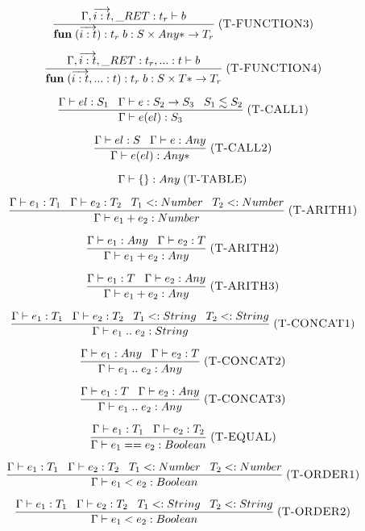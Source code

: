 \documentclass[12pt]{article}
\newcommand{\mylabel}[1]{\; (\textsc{#1})}
\newcommand{\subtype}{<:}
\newcommand{\kw}[1]{\mathbf{#1} \;}
\newcommand{\env}{\Gamma}
\newcommand{\ret}{\string_RET}
\begin{document}
\[
\frac{\env, \overrightarrow{i:t}, \ret:t_{r} \vdash b}
     {\kw{fun} (\overrightarrow{i:t}):t_{r} \; b :
      S \times {Any*} \rightarrow T_{r}}
\mylabel{T-FUNCTION3}
\]

\[
\frac{\env, \overrightarrow{i:t}, \ret:t_{r}, {...}:t \vdash b}
     {\kw{fun} (\overrightarrow{i:t}, {...}:t):t_{r} \; b :
      S \times {T*} \rightarrow T_{r}}
\mylabel{T-FUNCTION4}
\]

\[
\frac{\env \vdash el:S_{1} \;\;\;
      \env \vdash e:S_{2} \rightarrow S_{3} \;\;\;
      S_{1} \lesssim S_{2}}
     {\env \vdash e(el) : S_{3}}
\mylabel{T-CALL1}
\]

\[
\frac{\env \vdash el:S \;\;\;
      \env \vdash e:Any}
     {\env \vdash e(el) : {Any*}}
\mylabel{T-CALL2}
\]

\[
\env \vdash \{\} : Any
\mylabel{T-TABLE}
\]

\[
\frac{\env \vdash e_{1}:T_{1} \;\;\;
      \env \vdash e_{2}:T_{2} \;\;\;
      T_{1} \subtype Number \;\;\;
      T_{2} \subtype Number}
     {\env \vdash e_{1} + e_{2} : Number}
\mylabel{T-ARITH1}
\]

\[
\frac{\env \vdash e_{1}:Any \;\;\;
      \env \vdash e_{2}:T}
     {\env \vdash e_{1} + e_{2} : Any}
\mylabel{T-ARITH2}
\]

\[
\frac{\env \vdash e_{1}:T \;\;\;
      \env \vdash e_{2}:Any}
     {\env \vdash e_{1} + e_{2} : Any}
\mylabel{T-ARITH3}
\]

\[
\frac{\env \vdash e_{1}:T_{1} \;\;\;
      \env \vdash e_{2}:T_{2} \;\;\;
      T_{1} \subtype String \;\;\;
      T_{2} \subtype String}
     {\env \vdash e_{1} \; {..} \;  e_{2} : String}
\mylabel{T-CONCAT1}
\]

\[
\frac{\env \vdash e_{1}:Any \;\;\;
      \env \vdash e_{2}:T}
     {\env \vdash e_{1} \; {..} \; e_{2} : Any}
\mylabel{T-CONCAT2}
\]

\[
\frac{\env \vdash e_{1}:T \;\;\;
      \env \vdash e_{2}:Any}
     {\env \vdash e_{1} \; {..} \; e_{2} : Any}
\mylabel{T-CONCAT3}
\]

\[
\frac{\env \vdash e_{1}:T_{1} \;\;\;
      \env \vdash e_{2}:T_{2}}
     {\env \vdash e_{1} == e_{2} : Boolean}
\mylabel{T-EQUAL}
\]

\[
\frac{\env \vdash e_{1}:T_{1} \;\;\;
      \env \vdash e_{2}:T_{2} \;\;\;
      T_{1} \subtype Number \;\;\;
      T_{2} \subtype Number}
     {\env \vdash e_{1} < e_{2} : Boolean}
\mylabel{T-ORDER1}
\]

\[
\frac{\env \vdash e_{1}:T_{1} \;\;\;
      \env \vdash e_{2}:T_{2} \;\;\;
      T_{1} \subtype String \;\;\;
      T_{2} \subtype String}
     {\env \vdash e_{1} < e_{2} : Boolean}
\mylabel{T-ORDER2}
\]
\end{document}
